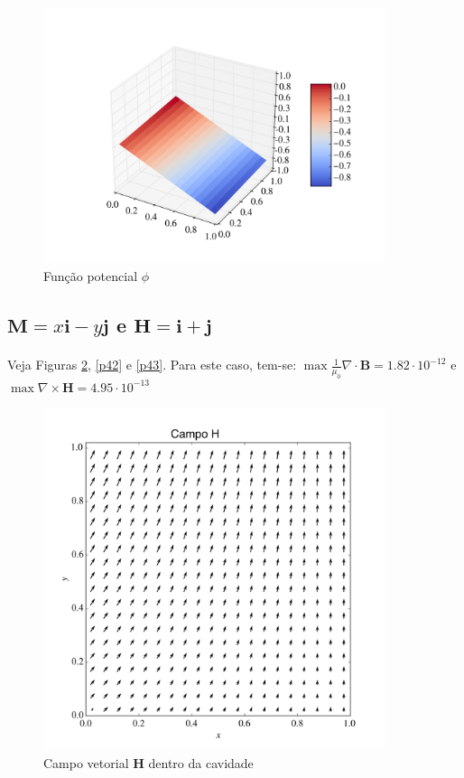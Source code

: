 \documentclass[a4paper,11pt]{article}
\begin{document}
\begin{figure}[!ht]
\centering
\includegraphics[width=10cm]{img/phiProblem2.png}
\caption{Função potencial $\phi$\label{p33}}
\end{figure}
\newpage

\subsection{$\mathbf{M} = x\mathbf{i}-y\mathbf{j}$ e $\mathbf{H} = \mathbf{i}+\mathbf{j}$}
\paragraph{} Veja Figuras \ref{p41}, \ref{p42} e \ref{p43}. Para este caso, tem-se: $\max \frac{1}{\mu_0}\nabla\cdot \mathbf{B}  = 1.82\cdot 10^{-12}$ e $\max \nabla\times \mathbf{H}  =4.95\cdot 	10^{-13}$

\begin{figure}[!ht]
\centering
\includegraphics[width=10cm]{img/Hproblem3.png}
\caption{Campo vetorial $\mathbf{H}$ dentro da cavidade\label{p41}}
\end{figure}
\end{document}
